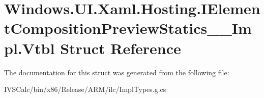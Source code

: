 \hypertarget{struct_windows_1_1_u_i_1_1_xaml_1_1_hosting_1_1_i_element_composition_preview_statics_____impl_1_1_vtbl}{}\section{Windows.\+U\+I.\+Xaml.\+Hosting.\+I\+Element\+Composition\+Preview\+Statics\+\_\+\+\_\+\+Impl.\+Vtbl Struct Reference}
\label{struct_windows_1_1_u_i_1_1_xaml_1_1_hosting_1_1_i_element_composition_preview_statics_____impl_1_1_vtbl}


The documentation for this struct was generated from the following file\+:\begin{DoxyCompactItemize}
\item 
I\+V\+S\+Calc/bin/x86/\+Release/\+A\+R\+M/ilc/Impl\+Types.\+g.\+cs\end{DoxyCompactItemize}
